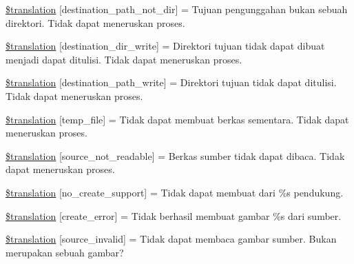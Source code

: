 \begin{DoxyCompactItemize}
\item 
\hyperlink{class_8upload_8id___i_d_8php_a5704a67137126e8c87b7a364175929d4}{\$translation} \mbox{[}\textquotesingle{}destination\+\_\+path\+\_\+not\+\_\+dir\textquotesingle{}\mbox{]} = \textquotesingle{}Tujuan pengunggahan bukan sebuah direktori. Tidak dapat meneruskan proses.\textquotesingle{}
\item 
\hyperlink{class_8upload_8id___i_d_8php_a97608ea194a616db49141a0e6dee900c}{\$translation} \mbox{[}\textquotesingle{}destination\+\_\+dir\+\_\+write\textquotesingle{}\mbox{]} = \textquotesingle{}Direktori tujuan tidak dapat dibuat menjadi dapat ditulisi. Tidak dapat meneruskan proses.\textquotesingle{}
\item 
\hyperlink{class_8upload_8id___i_d_8php_a40e4e1962226b89fd76da5819a9602b0}{\$translation} \mbox{[}\textquotesingle{}destination\+\_\+path\+\_\+write\textquotesingle{}\mbox{]} = \textquotesingle{}Direktori tujuan tidak dapat ditulisi. Tidak dapat meneruskan proses.\textquotesingle{}
\item 
\hyperlink{class_8upload_8id___i_d_8php_a2baece8da11e20d45175db91851ec3e3}{\$translation} \mbox{[}\textquotesingle{}temp\+\_\+file\textquotesingle{}\mbox{]} = \textquotesingle{}Tidak dapat membuat berkas sementara. Tidak dapat meneruskan proses.\textquotesingle{}
\item 
\hyperlink{class_8upload_8id___i_d_8php_a922967ca2df0efdd455261142d8e5715}{\$translation} \mbox{[}\textquotesingle{}source\+\_\+not\+\_\+readable\textquotesingle{}\mbox{]} = \textquotesingle{}Berkas sumber tidak dapat dibaca. Tidak dapat meneruskan proses.\textquotesingle{}
\item 
\hyperlink{class_8upload_8id___i_d_8php_a346dfd1ade29f583dd20d345c436859f}{\$translation} \mbox{[}\textquotesingle{}no\+\_\+create\+\_\+support\textquotesingle{}\mbox{]} = \textquotesingle{}Tidak dapat membuat dari \%s pendukung.\textquotesingle{}
\item 
\hyperlink{class_8upload_8id___i_d_8php_a53013ce9255c4e1849098ddd9fdb2b3f}{\$translation} \mbox{[}\textquotesingle{}create\+\_\+error\textquotesingle{}\mbox{]} = \textquotesingle{}Tidak berhasil membuat gambar \%s dari sumber.\textquotesingle{}
\item 
\hyperlink{class_8upload_8id___i_d_8php_a6ab0a660b457eaf2d3434b225449fdd6}{\$translation} \mbox{[}\textquotesingle{}source\+\_\+invalid\textquotesingle{}\mbox{]} = \textquotesingle{}Tidak dapat membaca gambar sumber. Bukan merupakan sebuah gambar?\textquotesingle{}
\item 

\end{DoxyCompactItemize}
